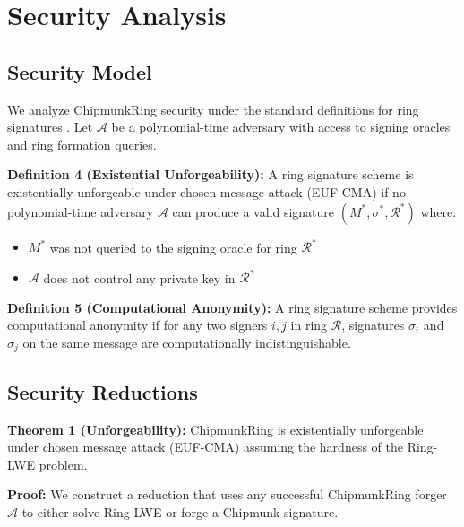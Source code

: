 \documentclass[11pt,a4paper]{article}
\begin{document}
\section{Security Analysis}

\subsection{Security Model}

We analyze ChipmunkRing security under the standard definitions for ring signatures \cite{rst01}. Let $\mathcal{A}$ be a polynomial-time adversary with access to signing oracles and ring formation queries.

\textbf{Definition 4 (Existential Unforgeability):} A ring signature scheme is existentially unforgeable under chosen message attack (EUF-CMA) if no polynomial-time adversary $\mathcal{A}$ can produce a valid signature $(M^*, \sigma^*, \mathcal{R}^*)$ where:
\begin{itemize}
\item $M^*$ was not queried to the signing oracle for ring $\mathcal{R}^*$
\item $\mathcal{A}$ does not control any private key in $\mathcal{R}^*$
\end{itemize}

\textbf{Definition 5 (Computational Anonymity):} A ring signature scheme provides computational anonymity if for any two signers $i, j$ in ring $\mathcal{R}$, signatures $\sigma_i$ and $\sigma_j$ on the same message are computationally indistinguishable.

\subsection{Security Reductions}

\textbf{Theorem 1 (Unforgeability):} ChipmunkRing is existentially unforgeable under chosen message attack (EUF-CMA) assuming the hardness of the Ring-LWE problem.

\textbf{Proof:} We construct a reduction that uses any successful ChipmunkRing forger $\mathcal{A}$ to either solve Ring-LWE or forge a Chipmunk signature.
\end{document}
